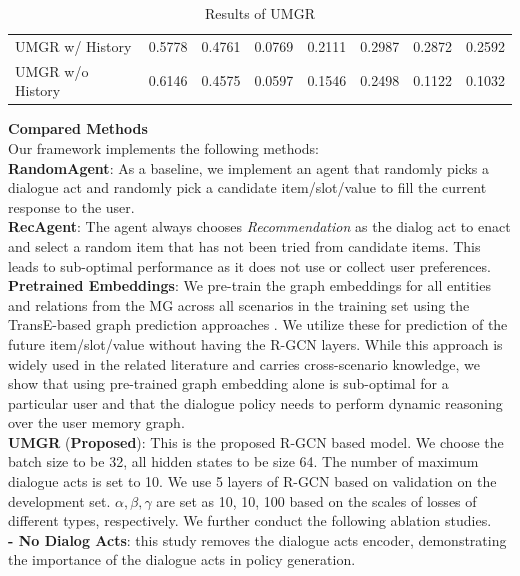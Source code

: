 \begin{table}[!t]
{\begin{tabular}{l|l|l|l|l|l|l||c}
\hline
UMGR w/ History & 0.5778 & 0.4761 & 0.0769 & 0.2111 & 0.2987 & 0.2872 & 0.2592 \\
UMGR w/o History & 0.6146 & 0.4575 & 0.0597 & 0.1546 & 0.2498 & 0.1122 & 0.1032 \\
        \hline
        \end{tabular}
    }
    \vspace{-2pt}
    \caption{Results of UMGR}     
    \vspace{-12pt}
\label{chap6:tbl:result}
\end{table}

\textbf{Compared Methods}\\
Our framework implements the following methods:\\
\noindent \textbf{RandomAgent}: As a baseline, we implement an agent that randomly picks a dialogue act and randomly pick a candidate item/slot/value to fill the current response to the user.\\
\noindent \textbf{RecAgent}: The agent always chooses \textit{Recommendation} as the dialog act to enact and select a random item that has not been tried from candidate items. This leads to sub-optimal performance as it does not use or collect user preferences.\\
\noindent \textbf{Pretrained Embeddings}: 
We pre-train the graph embeddings for all entities and relations from the MG across all scenarios in the training set using the TransE-based graph prediction approaches \cite{Nickel+15}.
We utilize these for prediction of the future item/slot/value without having the R-GCN layers.
While this approach is widely used in the related literature and carries cross-scenario knowledge, we show that using pre-trained graph embedding alone is sub-optimal for a particular user and that the dialogue policy needs to perform dynamic reasoning over the user memory graph.\\
\noindent \textbf{UMGR} (\textbf{Proposed}): This is the proposed R-GCN based model. We choose the batch size to be 32, all hidden states to be size 64. The number of maximum dialogue acts is set to 10. We use 5 layers of R-GCN based on validation on the development set. $\alpha, \beta, \gamma$ are set as 10, 10, 100 based on the scales of losses of different types, respectively. 
We further conduct the following ablation studies.\\
\noindent \textbf{- No Dialog Acts}: this study removes the dialogue acts encoder, demonstrating the importance of the dialogue acts in policy generation.

